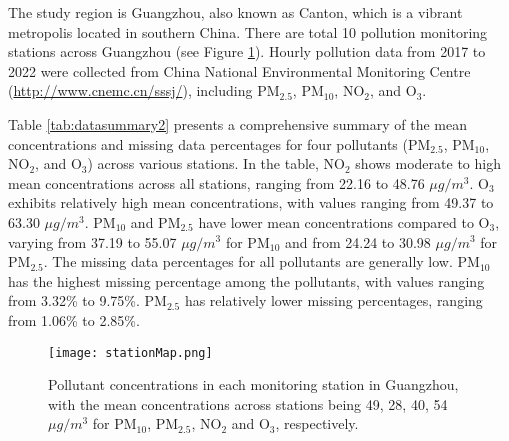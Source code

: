 \documentclass[
  12,
]{article}
\begin{document}
The study region is Guangzhou, also known as Canton, which is a vibrant
metropolis located in southern China. There are total 10 pollution
monitoring stations across Guangzhou (see Figure \ref{fig:guangzhou}).
Hourly pollution data from 2017 to 2022 were collected from China
National Environmental Monitoring Centre
(\url{http://www.cnemc.cn/sssj/}), including PM\(_{2.5}\), PM\(_{10}\),
NO\(_2\), and O\(_3\).

Table \ref{tab:datasummary2} presents a comprehensive summary of the
mean concentrations and missing data percentages for four pollutants
(PM\(_{2.5}\), PM\(_{10}\), NO\(_2\), and O\(_3\)) across various
stations. In the table, NO\(_2\) shows moderate to high mean
concentrations across all stations, ranging from 22.16 to 48.76
\(\mu g/m^{3}\). O\(_3\) exhibits relatively high mean concentrations,
with values ranging from 49.37 to 63.30 \(\mu g/m^{3}\). PM\(_{10}\) and
PM\(_{2.5}\) have lower mean concentrations compared to O\(_3\), varying
from 37.19 to 55.07 \(\mu g/m^{3}\) for PM\(_{10}\) and from 24.24 to
30.98 \(\mu g/m^{3}\) for PM\(_{2.5}\). The missing data percentages for
all pollutants are generally low. PM\(_{10}\) has the highest missing
percentage among the pollutants, with values ranging from 3.32\% to
9.75\%. PM\(_{2.5}\) has relatively lower missing percentages, ranging
from 1.06\% to 2.85\%.

\begin{figure}
  \centering
  \texttt{[image: stationMap.png]}
  \caption{Pollutant concentrations in each monitoring station in Guangzhou, with the mean concentrations across stations being 49, 28, 40, 54 $\mu g/m^{3}$ for PM$_{10}$, PM$_{2.5}$, NO$_2$ and O$_3$, respectively.}
  \label{fig:guangzhou} 
\end{figure}
\end{document}
